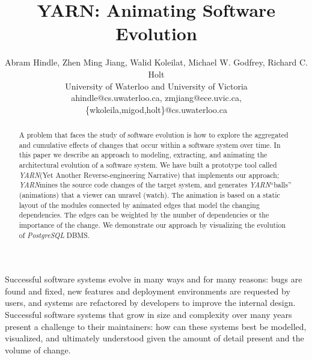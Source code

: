 \documentclass[times, 10pt,twocolumn]{article}
\newcommand{\igWh}[1]{\texttt{[image: \#1]}}
\newcommand{\yarn}{\emph{YARN\xspace}}
\newcommand{\YARN}{\yarn}
\newcommand{\postgresql}{\emph{PostgreSQL}\xspace}
\newcommand{\shtn}{\vspace*{-.5em}}
\begin{document}
\newcommand{\names}{Abram Hindle, Zhen Ming Jiang, Walid Koleilat,
  Michael W. Godfrey, Richard C. Holt}
\author{
\names \\
University of Waterloo and University of Victoria\\
ahindle@cs.uwaterloo.ca, zmjiang@ece.uvic.ca, \{wkoleila,migod,holt\}@cs.uwaterloo.ca
}
\title{
YARN: Animating Software Evolution
}

\maketitle
\thispagestyle{empty}

\begin{abstract}

  A problem that faces the study of software evolution is how to
  explore the aggregated and cumulative effects of changes that occur
  within a software system over time.  In this paper we describe an
  approach to modeling, extracting, and animating the architectural
  evolution of a software system.  We have built a prototype tool
  called \YARN (Yet Another Reverse-engineering Narrative) that
  implements our approach; \YARN mines the source code changes of the
  target system, and generates \YARN ``balls'' (animations) that a
  viewer can unravel (watch).  The animation is based on a static
  layout of the modules connected by animated edges that model the
  changing dependencies.  The edges can be weighted by the number of
  dependencies or the importance of the change.  We demonstrate our
  approach by visualizing the evolution of \postgresql DBMS.

\end{abstract}

\shtn
{}
\shtn

\newcommand{\abram}[1]{\emph{(***ABRAM***: #1)}}
\newcommand{\graphfigfile}[1]{presentation/graph#1}
\newcommand{\graphlabel}[1]{fig:graph#1}
\newcommand{\yarnshots}{6}
\newcommand{\graphfig}[1]{
\begin{figure}[!b]
  \centering
  \igWh{\graphfigfile{#1}}
  \caption{\postgresql \YARN Flip-book shot #1/\yarnshots}
  \label{\graphlabel{#1}}
\end{figure}
}



Successful software systems evolve in many ways and for many reasons:
bugs are found and fixed, new features and deployment environments are
requested by users, and systems are refactored by developers to
improve the internal design.  Successful software systems that grow in
size and complexity over many years present a challenge to their
maintainers: how can these systems best be modelled, visualized, and
ultimately understood given the amount of detail present and the
volume of change.
\end{document}
